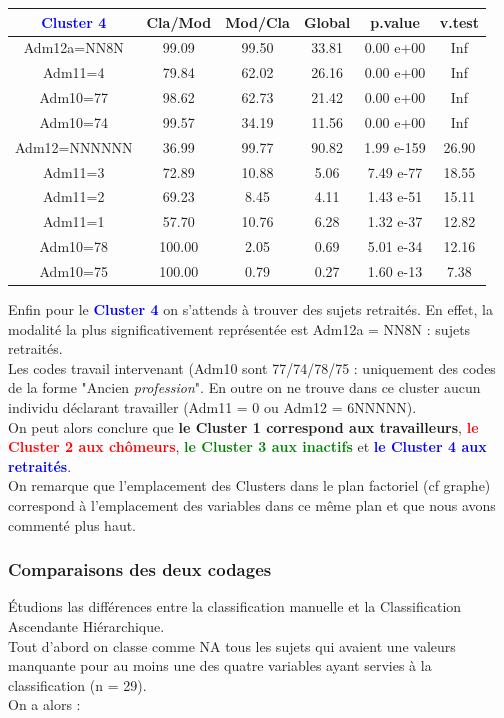 \documentclass{book}
\begin{document}
\setlength\arrayrulewidth{2pt}
\begin{tabular}{|c||ccccc|}
\hline
   \textbf{\textcolor{blue}{Cluster 4}} &Cla/Mod  &   Mod/Cla      &Global      & p.value  &   v.test\\
   \hline
   \hline
Adm12a=NN8N &  99.09 &99.50 &33.81 & 0.00 e+00  &      Inf\\
Adm11=4      & 79.84 &62.02 &26.16 & 0.00 e+00  &      Inf\\
Adm10=77      &98.62 &62.73 &21.42 & 0.00 e+00  &      Inf\\
Adm10=74      &99.57 &34.19 &11.56 & 0.00 e+00  &      Inf\\
Adm12=NNNNNN  &36.99 &99.77 &90.82 &1.99 e-159  &26.90\\
Adm11=3       &72.89 &10.88 &5.06 & 7.49 e-77  &18.55\\
Adm11=2       &69.23 & 8.45 &4.11 & 1.43 e-51  &15.11\\
Adm11=1       &57.70 &10.76 &6.28 & 1.32 e-37  &12.82\\
Adm10=78     &100.00 & 2.05 &0.69 & 5.01 e-34  &12.16\\
Adm10=75     &100.00 & 0.79 &0.27  &1.60 e-13 &  7.38\\
\hline
\end{tabular}

\noindent
Enfin pour le \textbf{\textcolor{blue}{Cluster 4}} on s'attends à trouver des sujets retraités. En effet, la modalité la plus significativement représentée est Adm12a = NN8N : sujets retraités. \\
Les codes travail intervenant (Adm10 sont 77/74/78/75 : uniquement des codes de la forme "Ancien \textit{profession}".
En outre on ne trouve dans ce cluster aucun individu déclarant travailler (Adm11 = 0 ou Adm12 = 6NNNNN).\\

\noindent
On peut alors conclure que  \textbf{le Cluster 1 correspond aux travailleurs}, \textbf{\textcolor{red}{le Cluster 2 aux chômeurs}}, \textbf{\textcolor{green}{le Cluster 3 aux inactifs}} et \textbf{\textcolor{blue}{le Cluster 4 aux retraités}}.\\
On remarque que l'emplacement des Clusters dans le plan factoriel (cf graphe) correspond à l'emplacement des variables dans ce même plan et que nous avons commenté plus haut.

\subsubsection{Comparaisons des deux codages}
\noindent
Étudions las différences entre la classification manuelle et la Classification Ascendante Hiérarchique.\\
Tout d'abord on classe comme NA tous les sujets qui avaient une valeurs manquante pour au moins une des quatre variables ayant servies à la classification (n = 29).\\
On a alors : \\
\end{document}
